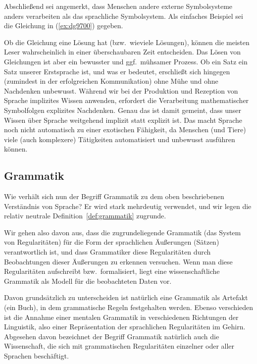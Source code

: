 Abschließend sei angemerkt, dass Menschen andere externe Symbolsysteme anders verarbeiten als das sprachliche Symbolsystem.
Als einfaches Beispiel sei die Gleichung in (\ref{ex:dg9700}) gegeben.

\begin{exe}
\end{exe}

Ob die Gleichung eine Lösung hat (bzw.\ wieviele Lösungen), können die meisten Leser wahrscheinlich in einer überschaubaren Zeit entscheiden.
Das Lösen von Gleichungen ist aber ein bewusster und ggf.\ mühsamer Prozess.
Ob ein Satz ein Satz unserer Erstsprache ist, und was er bedeutet, erschließt sich hingegen (zumindest in der erfolgreichen Kommunikation) ohne Mühe und ohne Nachdenken unbewusst.
Während wir bei der Produktion und Rezeption von Sprache implizites Wissen anwenden, erfordert die Verarbeitung mathematischer Symbolfolgen explizites Nachdenken.
Genau das ist damit gemeint, dass unser Wissen über Sprache weitgehend implizit statt explizit ist.
Das macht Sprache noch nicht automatisch zu einer exotischen Fähigkeit, da Menschen (und Tiere) viele (auch komplexere) Tätigkeiten automatisiert und unbewusst ausführen können.

\subsection{Grammatik}

Wie verhält sich nun der Begriff Grammatik zu dem oben beschriebenen Verständnis von Sprache?
Er wird stark mehrdeutig verwendet, und wir legen die relativ neutrale Definition~\ref{def:grammatik} zugrunde.


Wir gehen also davon aus, dass die zugrundeliegende Grammatik (das System von Regularitäten) für die Form der sprachlichen Äußerungen (\zB Sätzen) verantwortlich ist, und dass Grammatiker diese Regularitäten durch Beobachtungen dieser Äußerungen zu erkennen versuchen.
Wenn man diese Regularitäten aufschreibt bzw.\ formalisiert, liegt eine wissenschaftliche Grammatik als Modell für die beobachteten Daten vor.

Davon grundsätzlich zu unterscheiden ist natürlich eine Grammatik als Artefakt (\zB ein Buch), in dem grammatische Regeln festgehalten werden.
Ebenso verschieden ist die Annahme einer mentalen Grammatik in verschiedenen Richtungen der Linguistik, also einer Repräsentation der sprachlichen Regularitäten im Gehirn.
Abgesehen davon bezeichnet der Begriff Grammatik natürlich auch die Wissenschaft, die sich mit grammatischen Regularitäten einzelner oder aller Sprachen beschäftigt.

